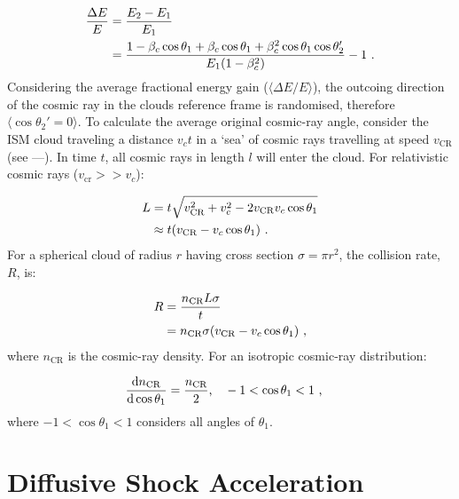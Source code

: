 \begin{equation}
    \begin{aligned}
        \frac{\Delta E}{E}&=\frac{E_2-E_1}{E_1} \\
        &=\frac{1-\beta_c\cos\theta_1+\beta_c\cos\theta_1+\beta_c^2\cos\theta_1\cos\theta_2'}{E_1\qty(1-\beta_c^2)}-1\text{ .}
    \end{aligned}
\end{equation}
\noindent Considering the average fractional energy gain ($\langle \Delta E/E \rangle$), the outcoing direction of the cosmic ray in the clouds reference frame is randomised, therefore $\langle \cos\theta_2'=0 \rangle$. To calculate the average original cosmic-ray angle, consider the ISM cloud traveling a distance $v_ct$ in a `sea' of cosmic rays travelling at speed $v_\text{CR}$ (see ---). In time $t$, all cosmic rays in length $l$ will enter the cloud. For relativistic cosmic rays ($v_\text{cr}>>v_c$):

\begin{equation}
    \begin{aligned}
        L&=t\sqrt{v_\text{CR}^2+v_c^2-2v_\text{CR}v_c\cos\theta_1} \\
        &\approx t\qty(v_\text{CR}-v_c\cos\theta_1) \text{ .}
    \end{aligned}
\end{equation}
\noindent For a spherical cloud of radius $r$ having cross section $\sigma=\pi r^2$, the collision rate, $R$, is:

\begin{equation}
    \begin{aligned}
        R&=\frac{n_\text{CR}L\sigma}{t} \\
        &=n_\text{CR}\sigma\qty(v_\text{CR}-v_c\cos\theta_1) \text { ,}
    \end{aligned}
\end{equation}
\noindent where $n_\text{CR}$ is the cosmic-ray density. For an isotropic cosmic-ray distribution:

\begin{equation}
    \begin{aligned}
        \dv{n_\text{CR}}{\cos\theta_1}&=\frac{n_\text{CR}}{2}\text{,}\quad -1<\cos\theta_1<1\text{ ,}
    \end{aligned}
\end{equation}
\noindent where $-1<\cos\theta_1<1$ considers all angles of $\theta_1$.

\section{Diffusive Shock Acceleration}

